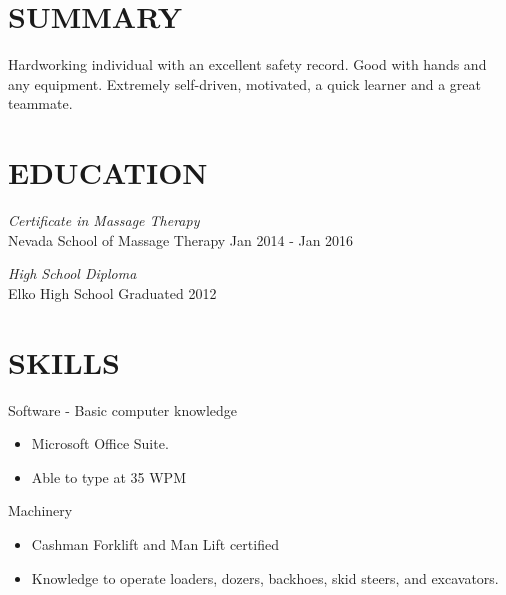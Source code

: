 \documentclass[margin, 10pt]{res} %
\begin{document}
\begin{resume}

     
    \section{SUMMARY}  
    Hardworking individual with an excellent safety record. Good with hands and any equipment. Extremely self-driven, motivated, a quick learner and a great teammate.


    \section{EDUCATION}

    {\sl Certificate in Massage Therapy} \\ Nevada School of Massage Therapy \hfill Jan 2014 - Jan 2016

    {\sl High School Diploma} \\ Elko High School \hfill Graduated 2012


    \section{SKILLS}

    Software - Basic computer knowledge
\begin{itemize} \itemsep -2pt
        \item Microsoft Office Suite.
        \item Able to type at 35 WPM
    \end{itemize} 

    Machinery 
\begin{itemize} \itemsep -2pt
        \item Cashman Forklift and Man Lift certified
        \item Knowledge to operate loaders, dozers, backhoes, skid steers, and excavators.  
    \end{itemize} 
     

\end{resume}
\end{document}
